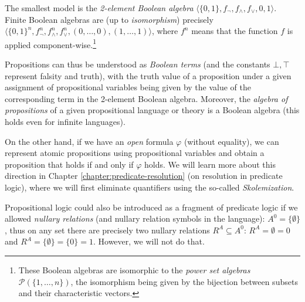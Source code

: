 The smallest model is the \emph{2-element Boolean algebra} $\langle \{0,1\},f_\neg,f_\land,f_\lor,0,1\rangle$. Finite Boolean algebras are (up to \emph{isomorphism}) precisely $\langle \{0,1\}^n,f_\neg^n,f_\land^n,f_\lor^n,(0,\dots,0),(1,\dots,1)\rangle$, where $f^n$ means that the function $f$ is applied component-wise.\footnote{These Boolean algebras are isomorphic to the \emph{power set algebras} $\mathcal P(\{1,\dots,n\})$, the isomorphism being given by the bijection between subsets and their characteristic vectors.}

Propositions can thus be understood as \emph{Boolean terms} (and the constants $\bot,\top$ represent falsity and truth), with the truth value of a proposition under a given assignment of propositional variables being given by the value of the corresponding term in the 2-element Boolean algebra. Moreover, the \emph{algebra of propositions} of a given propositional language or theory is a Boolean algebra (this holds even for infinite languages).

On the other hand, if we have an \emph{open} formula $\varphi$ (without equality), we can represent atomic propositions using propositional variables and obtain a proposition that holds if and only if $\varphi$ holds. We will learn more about this direction in Chapter \ref{chapter:predicate-resolution} (on resolution in predicate logic), where we will first eliminate quantifiers using the so-called \emph{Skolemization}.

Propositional logic could also be introduced as a fragment of predicate logic if we allowed \emph{nullary relations} (and nullary relation symbols in the language): $A^0=\{\emptyset\}$, thus on any set there are precisely two nullary relations $R^A\subseteq A^0$: $R^A=\emptyset=0$ and $R^A=\{\emptyset\}=\{0\}=1$. However, we will not do that.
